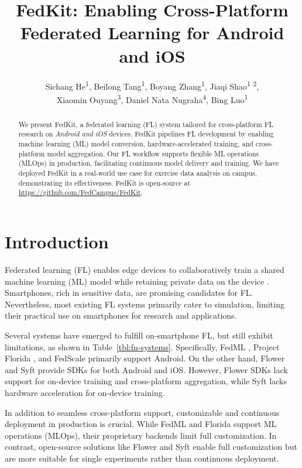 \documentclass[letterpaper]{article} %
\title{FedKit: Enabling Cross-Platform Federated Learning for Android and iOS}
\author{
    Sichang He\textsuperscript{\rm 1},
    Beilong Tang\textsuperscript{\rm 1},
    Boyang Zhang\textsuperscript{\rm 1},
    Jiaqi Shao\textsuperscript{\rm 1} \textsuperscript{\rm 2},
    \\
    Xiaomin Ouyang\textsuperscript{\rm 3},
    Daniel Nata Nugraha\textsuperscript{\rm 4},
    Bing Luo\textsuperscript{\rm 1}
}
\begin{document}
\maketitle

\begin{abstract}
    We present FedKit, a federated learning (FL) system tailored for
    cross-platform FL research on \textit{Android and iOS} devices.
    FedKit pipelines FL development by
    enabling machine learning (ML) model conversion,
    hardware-accelerated training,
    and cross-platform model aggregation.
    Our FL workflow supports flexible ML operations (MLOps) in production,
    facilitating continuous model delivery and training.
    We have deployed FedKit in a real-world use case for
    exercise data analysis on campus,
    demonstrating its effectiveness.
    FedKit is open-source at \url{https://github.com/FedCampus/FedKit}.
\end{abstract}

\section{Introduction}

Federated learning (FL) enables edge devices to
collaboratively train a shared machine learning (ML) model while
retaining private data on the device \cite{mcmahan2017communication}.
Smartphones, rich in sensitive data,
are promising candidates for FL.
Nevertheless, most existing FL systems
\cite[e.g.,][]{bonawitz2019towards,liu2021fate,ma2019paddlepaddle,openfl_citation}
primarily cater to simulation,
limiting their practical use on smartphones for research and applications.

Several systems have emerged to fulfill on-smartphone FL,
but still exhibit limitations,
as shown in Table~\ref{tbl:fn-systems}.
Specifically, FedML \cite{he2020fedml},
Project Florida \cite{madrigal2023project},
and FedScale \cite{lai2022fedscale} primarily support Android.
On the other hand,
Flower \cite{beutel2020flower,mathur2021ondevice} and
Syft \cite{ryffel2018generic,Ziller2021,hall2021syft}
provide SDKs for both Android and iOS.
However, Flower SDKs lack support for on-device training and
cross-platform aggregation,
while Syft lacks hardware acceleration for on-device training.

In addition to seamless cross-platform support,
customizable and continuous deployment in production is crucial.
While FedML and Florida support ML operations (MLOps),
their proprietary backends limit full customization.
In contrast, open-source solutions like Flower and Syft enable
full customization
but are more suitable for single experiments rather than continuous deployment.
\end{document}
